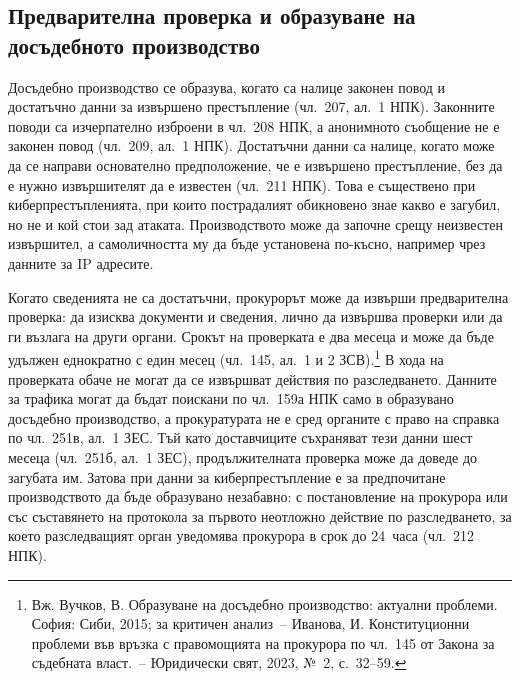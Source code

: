 \subsection{Предварителна проверка и образуване на досъдебното производство}
\label{sec:obrazuvane}

Досъдебно производство се образува, когато са налице законен повод и достатъчно данни за
извършено престъпление (чл.~207, ал.~1 НПК). Законните поводи са изчерпателно изброени в
чл.~208 НПК, а анонимното съобщение не е законен повод (чл.~209, ал.~1 НПК). Достатъчни
данни са налице, когато може да се направи основателно предположение, че е извършено
престъпление, без да е нужно извършителят да е известен (чл.~211 НПК). Това е съществено
при киберпрестъпленията, при които пострадалият обикновено знае какво е загубил, но не и
кой стои зад атаката. Производството може да започне срещу неизвестен извършител, а
самоличността му да бъде установена по-късно, например чрез данните за IP адресите.

Когато сведенията не са достатъчни, прокурорът може да извърши предварителна проверка:
да изисква документи и сведения, лично да извършва проверки или да ги възлага на други
органи. Срокът на проверката е два месеца и може да бъде удължен еднократно с един месец
(чл.~145, ал.~1 и 2 ЗСВ).\footnote{Вж. Вучков, В. Образуване на досъдебно производство: актуални
проблеми. София: Сиби, 2015; за критичен анализ~-- Иванова, И. Конституционни проблеми във
връзка с правомощията на прокурора по чл.~145 от Закона за съдебната власт.~-- Юридически
свят, 2023, №~2, с.~32--59.} В хода на проверката обаче не могат да се извършват действия по
разследването. Данните за трафика могат да бъдат поискани по чл.~159а НПК само в
образувано досъдебно производство, а прокуратурата не е сред органите с право на справка
по чл.~251в, ал.~1 ЗЕС. Тъй като доставчиците съхраняват тези данни шест месеца
(чл.~251б, ал.~1 ЗЕС), продължителната проверка може да доведе до загубата им. Затова при
данни за киберпрестъпление е за предпочитане производството да бъде образувано
незабавно: с постановление на прокурора или със съставянето на протокола за първото
неотложно действие по разследването, за което разследващият орган уведомява прокурора в
срок до 24~часа (чл.~212 НПК).

